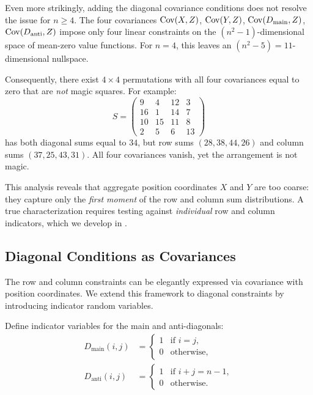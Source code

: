 \begin{remark}
\label{rem:four_term_insufficient}
Even more strikingly, adding the diagonal covariance conditions does not resolve the issue for $n \geq 4$.
The four covariances $\mathrm{Cov}(X, Z)$, $\mathrm{Cov}(Y, Z)$, $\mathrm{Cov}(D_{\mathrm{main}}, Z)$, $\mathrm{Cov}(D_{\mathrm{anti}}, Z)$
impose only four linear constraints on the $(n^2 - 1)$-dimensional space of mean-zero value functions.
For $n = 4$, this leaves an $(n^2 - 5) = 11$-dimensional nullspace.

Consequently, there exist $4 \times 4$ permutations with all four covariances equal to zero 
that are \emph{not} magic squares. For example:
\[
S = \begin{pmatrix}
9 & 4 & 12 & 3 \\
16 & 1 & 14 & 7 \\
10 & 15 & 11 & 8 \\
2 & 5 & 6 & 13
\end{pmatrix}
\]
has both diagonal sums equal to $34$, but row sums $(28, 38, 44, 26)$ and column sums $(37, 25, 43, 31)$.
All four covariances vanish, yet the arrangement is not magic.
\end{remark}

This analysis reveals that aggregate position coordinates $X$ and $Y$ are too coarse:
they capture only the \emph{first moment} of the row and column sum distributions.
A true characterization requires testing against \emph{individual} row and column indicators,
which we develop in .

\subsection{Diagonal Conditions as Covariances}
\label{sec:diagonal_cov}

The row and column constraints can be elegantly expressed via covariance with position coordinates.
We extend this framework to diagonal constraints by introducing indicator random variables.

\begin{definition}
Define indicator variables for the main and anti-diagonals:
\begin{align}
D_{\mathrm{main}}(i,j) &= \begin{cases} 1 & \text{if } i = j, \\ 0 & \text{otherwise}, \end{cases} \\
D_{\mathrm{anti}}(i,j) &= \begin{cases} 1 & \text{if } i + j = n - 1, \\ 0 & \text{otherwise}. \end{cases}
\end{align}
\end{definition}

